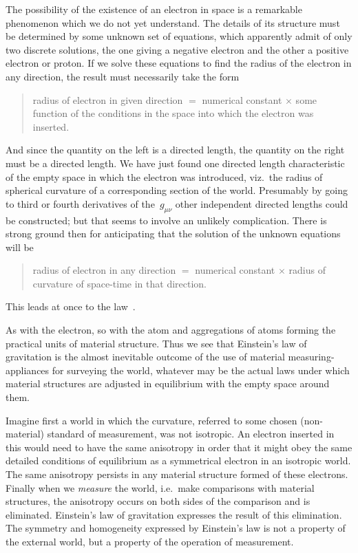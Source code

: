 \documentclass[12pt]{book}
\begin{document}
The possibility of the existence of an electron in space is a remarkable
phenomenon which we do not yet understand. The details of its structure
must be determined by some unknown set of equations, which apparently
admit of only two discrete solutions, the one giving a negative electron and
the other a positive electron or proton. If we solve these equations to find
the radius of the electron in any direction, the result must necessarily take
the form
\begin{quote}
  radius of electron in given direction $=$ numerical constant $\times$ some
  function of the conditions in the space into which the electron
  was inserted.
\end{quote}
And since the quantity on the left is a directed length, the quantity on the
right must be a directed length. We have just found one directed length
characteristic of the empty space in which the electron was introduced, viz.\
the radius of spherical curvature of a corresponding section of the world.
Presumably by going to third or fourth derivatives of the~$g_{\mu\nu}$ other independent
directed lengths could be constructed; but that seems to involve an unlikely
complication. There is strong ground then for anticipating that the solution
of the unknown equations will be
\begin{quote}
radius of electron in any direction $=$ numerical constant $\times$ radius of
curvature of space-time in that direction.
\end{quote}
This leads at once to the law~.

As with the electron, so with the atom and aggregations of atoms forming
the practical units of material structure. Thus we see that Einstein's law of
gravitation is the almost inevitable outcome of the use of material measuring-appliances
for surveying the world, whatever may be the actual laws under
which material structures are adjusted in equilibrium with the empty space
around them.

Imagine first a world in which the curvature, referred to some chosen
(non-material) standard of measurement, was not isotropic. An electron inserted
in this would need to have the same anisotropy in order that it might
obey the same detailed conditions of equilibrium as a symmetrical electron in
an isotropic world. The same anisotropy persists in any material structure
formed of these electrons. Finally when we \emph{measure} the world, i.e.\ make comparisons
with material structures, the anisotropy occurs on both sides of the
comparison and is eliminated. Einstein's law of gravitation expresses the
\index{Einstein's law of gravitation!interpretation of}%
result of this elimination. The symmetry and homogeneity expressed by
Einstein's law is not a property of the external world, but a property of the
operation of measurement.
\end{document}
